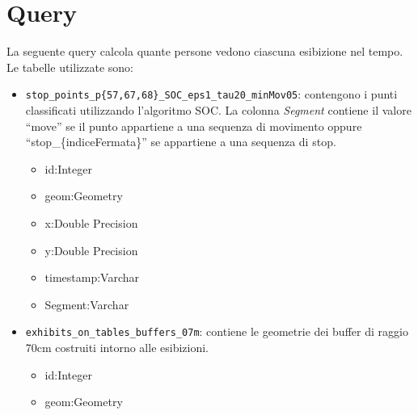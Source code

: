 \documentclass[12pt]{article}
\begin{document}
\section{Query}\label{section_query}
La seguente query calcola quante persone vedono ciascuna esibizione nel tempo.
Le tabelle utilizzate sono:
\begin{itemize}
    \item \lstinline[basicstyle=\ttfamily]!stop_points_p{57,67,68}_SOC_eps1_tau20_minMov05!: contengono i punti classificati utilizzando l'algoritmo SOC.
    La colonna \emph{Segment} contiene il valore “move” se il punto appartiene a una sequenza di movimento oppure “stop\_\{indiceFermata\}” se appartiene a una sequenza di stop.
    \begin{itemize}
        \item id:Integer
        \item geom:Geometry
        \item x:Double Precision
        \item y:Double Precision
        \item timestamp:Varchar
        \item Segment:Varchar
    \end{itemize}
    \item  \lstinline[basicstyle=\ttfamily]!exhibits_on_tables_buffers_07m!: contiene le geometrie dei buffer di raggio 70cm costruiti intorno alle esibizioni.
    \begin{itemize}
        \item id:Integer
        \item geom:Geometry
    \end{itemize}
\end{itemize}
\end{document}

